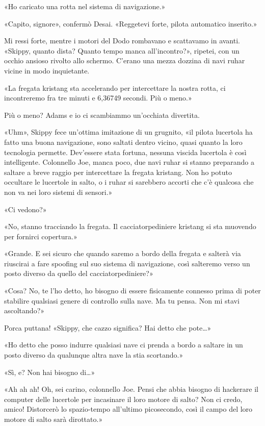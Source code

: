 «Ho caricato una rotta nel sistema di navigazione.»

«Capito, signore», confermò Desai. «Reggetevi forte, pilota automatico
inserito.»

Mi ressi forte, mentre i motori del Dodo rombavano e scattavamo in
avanti. «Skippy, quanto dista? Quanto tempo manca all'incontro?»,
ripetei, con un occhio ansioso rivolto allo schermo. C'erano una mezza
dozzina di navi ruhar vicine in modo inquietante.

«La fregata kristang sta accelerando per intercettare la nostra rotta,
ci incontreremo fra tre minuti e 6,36749 secondi. Più o meno.»

Più o meno? Adams e io ci scambiammo un'occhiata divertita.

«Uhm», Skippy fece un'ottima imitazione di un grugnito, «il pilota
lucertola ha fatto una buona navigazione, sono saltati dentro vicino,
quasi quanto la loro tecnologia permette. Dev'essere stata fortuna,
nessuna viscida lucertola è così intelligente. Colonnello Joe, manca
poco, due navi ruhar si stanno preparando a saltare a breve raggio per
intercettare la fregata kristang. Non ho potuto occultare le lucertole
in salto, o i ruhar si sarebbero accorti che c'è qualcosa che non va nei
loro sistemi di sensori.»

«Ci vedono?»

«No, stanno tracciando la fregata. Il cacciatorpediniere kristang si sta
muovendo per fornirci copertura.»

«Grande. E sei sicuro che quando saremo a bordo della fregata e salterà
via riuscirai a fare spoofing sul suo sistema di navigazione, così
salteremo verso un posto diverso da quello del cacciatorpediniere?»

«Cosa? No, te l'ho detto, ho bisogno di essere fisicamente connesso
prima di poter stabilire qualsiasi genere di controllo sulla nave. Ma tu
pensa. Non mi stavi ascoltando?»

Porca puttana! «Skippy, che cazzo significa? Hai detto che pote\ldots»

«Ho detto che posso indurre qualsiasi nave ci prenda a bordo a saltare
in un posto diverso da qualunque altra nave la stia scortando.»

«Sì, e? Non hai bisogno di\ldots»

«Ah ah ah! Oh, sei carino, colonnello Joe. Pensi che abbia bisogno di
hackerare il computer delle lucertole per incasinare il loro motore di
salto? Non ci credo, amico! Distorcerò lo spazio-tempo all'ultimo
picosecondo, così il campo del loro motore di salto sarà dirottato.»

